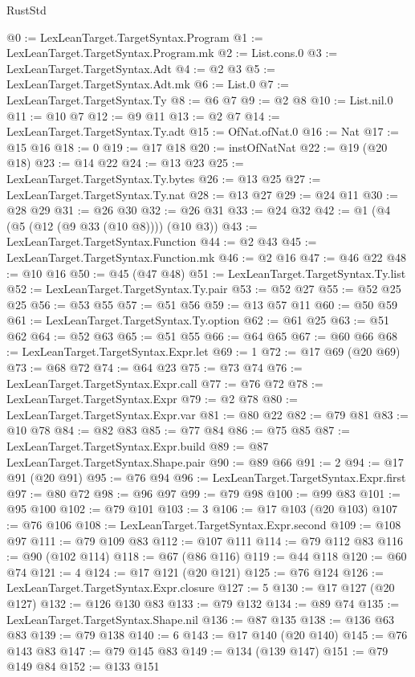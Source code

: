 \begin{lexlean}{RustStd}
\begin{coremodule}
@0 := LexLeanTarget.TargetSyntax.Program
@1 := LexLeanTarget.TargetSyntax.Program.mk
@2 := List.cons.{0}
@3 := LexLeanTarget.TargetSyntax.Adt
@4 := @2 @3
@5 := LexLeanTarget.TargetSyntax.Adt.mk
@6 := List.{0}
@7 := LexLeanTarget.TargetSyntax.Ty
@8 := @6 @7
@9 := @2 @8
@10 := List.nil.{0}
@11 := @10 @7
@12 := @9 @11
@13 := @2 @7
@14 := LexLeanTarget.TargetSyntax.Ty.adt
@15 := OfNat.ofNat.{0}
@16 := Nat
@17 := @15 @16
@18 := 0
@19 := @17 @18
@20 := instOfNatNat
@22 := @19 (@20 @18)
@23 := @14 @22
@24 := @13 @23
@25 := LexLeanTarget.TargetSyntax.Ty.bytes
@26 := @13 @25
@27 := LexLeanTarget.TargetSyntax.Ty.nat
@28 := @13 @27
@29 := @24 @11
@30 := @28 @29
@31 := @26 @30
@32 := @26 @31
@33 := @24 @32
@42 := @1 (@4 (@5 (@12 (@9 @33 (@10 @8)))) (@10 @3))
@43 := LexLeanTarget.TargetSyntax.Function
@44 := @2 @43
@45 := LexLeanTarget.TargetSyntax.Function.mk
@46 := @2 @16
@47 := @46 @22
@48 := @10 @16
@50 := @45 (@47 @48)
@51 := LexLeanTarget.TargetSyntax.Ty.list
@52 := LexLeanTarget.TargetSyntax.Ty.pair
@53 := @52 @27
@55 := @52 @25 @25
@56 := @53 @55
@57 := @51 @56
@59 := @13 @57 @11
@60 := @50 @59
@61 := LexLeanTarget.TargetSyntax.Ty.option
@62 := @61 @25
@63 := @51 @62
@64 := @52 @63
@65 := @51 @55
@66 := @64 @65
@67 := @60 @66
@68 := LexLeanTarget.TargetSyntax.Expr.let
@69 := 1
@72 := @17 @69 (@20 @69)
@73 := @68 @72
@74 := @64 @23
@75 := @73 @74
@76 := LexLeanTarget.TargetSyntax.Expr.call
@77 := @76 @72
@78 := LexLeanTarget.TargetSyntax.Expr
@79 := @2 @78
@80 := LexLeanTarget.TargetSyntax.Expr.var
@81 := @80 @22
@82 := @79 @81
@83 := @10 @78
@84 := @82 @83
@85 := @77 @84
@86 := @75 @85
@87 := LexLeanTarget.TargetSyntax.Expr.build
@89 := @87 LexLeanTarget.TargetSyntax.Shape.pair
@90 := @89 @66
@91 := 2
@94 := @17 @91 (@20 @91)
@95 := @76 @94
@96 := LexLeanTarget.TargetSyntax.Expr.first
@97 := @80 @72
@98 := @96 @97
@99 := @79 @98
@100 := @99 @83
@101 := @95 @100
@102 := @79 @101
@103 := 3
@106 := @17 @103 (@20 @103)
@107 := @76 @106
@108 := LexLeanTarget.TargetSyntax.Expr.second
@109 := @108 @97
@111 := @79 @109 @83
@112 := @107 @111
@114 := @79 @112 @83
@116 := @90 (@102 @114)
@118 := @67 (@86 @116)
@119 := @44 @118
@120 := @60 @74
@121 := 4
@124 := @17 @121 (@20 @121)
@125 := @76 @124
@126 := LexLeanTarget.TargetSyntax.Expr.closure
@127 := 5
@130 := @17 @127 (@20 @127)
@132 := @126 @130 @83
@133 := @79 @132
@134 := @89 @74
@135 := LexLeanTarget.TargetSyntax.Shape.nil
@136 := @87 @135
@138 := @136 @63 @83
@139 := @79 @138
@140 := 6
@143 := @17 @140 (@20 @140)
@145 := @76 @143 @83
@147 := @79 @145 @83
@149 := @134 (@139 @147)
@151 := @79 @149 @84
@152 := @133 @151

\end{coremodule}
\end{lexlean}

